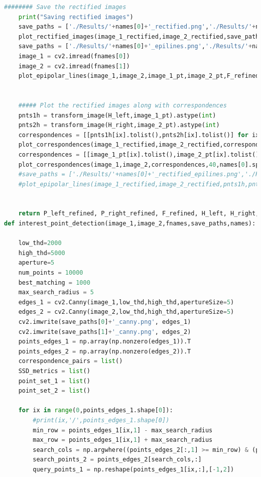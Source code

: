 \documentclass{article}
\begin{document}
\begin{lstlisting}[language=Python]
	######## Save the rectified images
	print("Saving rectified images")
	save_paths = ['./Results/'+names[0]+'_rectified.png','./Results/'+names[1]+'_rectified.png']
	plot_rectified_images(image_1_rectified,image_2_rectified,save_paths)
	save_paths = ['./Results/'+names[0]+'_epilines.png','./Results/'+names[1]+'_epilines.png']
	image_1 = cv2.imread(fnames[0])
	image_2 = cv2.imread(fnames[1])
	plot_epipolar_lines(image_1,image_2,image_1_pt,image_2_pt,F_refined,save_paths)


	##### Plot the rectified images along with correspondences
	pnts1h = transform_image(H_left,image_1_pt).astype(int)
	pnts2h = transform_image(H_right,image_2_pt).astype(int)
	correspondences = [[pnts1h[ix].tolist(),pnts2h[ix].tolist()] for ix in range(pnts1h.shape[0])]
	plot_correspondences(image_1_rectified,image_2_rectified,correspondences,40,names[0].split('_')[0]+'_Rectified_Correspondences')
	correspondences = [[image_1_pt[ix].tolist(),image_2_pt[ix].tolist()] for ix in range(image_1_pt.shape[0])]
	plot_correspondences(image_1,image_2,correspondences,40,names[0].split('_')[0]+'_Original_Correspondences')
	#save_paths = ['./Results/'+names[0]+'_rectified_epilines.png','./Results/'+names[1]+'_rectified_epilines.png']
	#plot_epipolar_lines(image_1_rectified,image_2_rectified,pnts1h,pnts2h,F_refined,save_paths)


	return P_left_refined, P_right_refined, F_refined, H_left, H_right, left_epipole_refined, right_epipole_refined, image_1_rectified, image_2_rectified
def interest_point_detection(image_1,image_2,fnames,save_paths,names):

	low_thd=2000
	high_thd=5000
	aperture=5
	num_points = 10000
	best_matching = 1000
	max_search_radius = 5
	edges_1 = cv2.Canny(image_1,low_thd,high_thd,apertureSize=5)
	edges_2 = cv2.Canny(image_2,low_thd,high_thd,apertureSize=5)
	cv2.imwrite(save_paths[0]+'_canny.png', edges_1)
	cv2.imwrite(save_paths[1]+'_canny.png', edges_2)
	points_edges_1 = np.array(np.nonzero(edges_1)).T
	points_edges_2 = np.array(np.nonzero(edges_2)).T
	correspondence_pairs = list()
	SSD_metrics = list()
	point_set_1 = list()
	point_set_2 = list()

	for ix in range(0,points_edges_1.shape[0]):
		#print(ix,'/',points_edges_1.shape[0])
		min_row = points_edges_1[ix,1] - max_search_radius
		max_row = points_edges_1[ix,1] + max_search_radius
		search_cols = np.argwhere((points_edges_2[:,1] >= min_row) & (points_edges_2[:,1] <= max_row)).squeeze()
		search_points_2 = points_edges_2[search_cols,:]
		query_points_1 = np.reshape(points_edges_1[ix,:],[-1,2])


\end{lstlisting}
\end{document}
